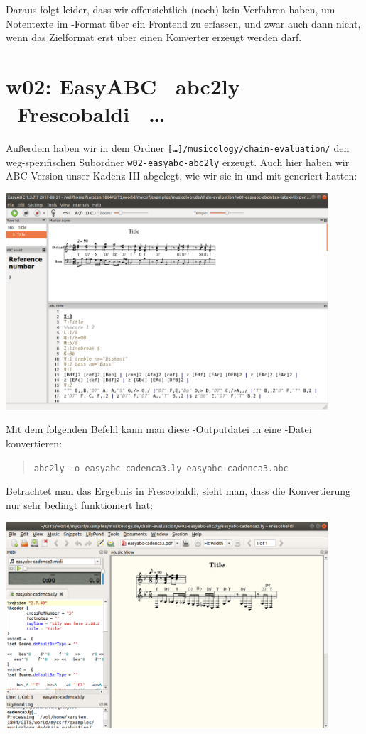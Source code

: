 Daraus folgt leider, dass wir offensichtlich (noch) kein Verfahren haben, um 
Notentexte im -Format über ein Frontend zu erfassen, und zwar auch
dann nicht, wenn das Zielformat erst über einen Konverter erzeugt werden darf.

\section{w02: Easy\-ABC \ra\ abc2ly  \ra\ Frescobaldi \ra\ \ldots}\label{w02}

Außerdem haben wir in dem Ordner \texttt{[\ldots]/musicology/chain-evaluation/}
den weg-spezifischen Subordner \texttt{w02-easyabc-abc2ly} erzeugt. Auch hier
haben wir ABC-Version unser Kadenz III abgelegt, wie wir sie in und mit
 generiert hatten:

\begin{center}
\includegraphics[width=0.9\textwidth]{frontends/easyabc/easyabc-cadenca3.png}
\end{center}

Mit dem folgenden Befehl kann man diese -Outputdatei in eine
-Datei konvertieren:

\begin{quote}\texttt{abc2ly -o easyabc-cadenca3.ly easyabc-cadenca3.abc}\end{quote}

Betrachtet man das Ergebnis in Frescobaldi, sieht man, dass die Konvertierung
nur sehr bedingt funktioniert hat:

\begin{center}
\includegraphics[width=0.9\textwidth]{frontends/easyabc/easyabc-cadenca3-in-frescobaldi.png}
\end{center}

